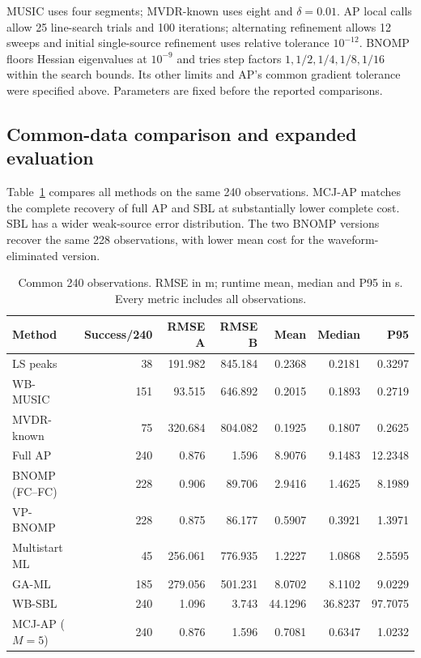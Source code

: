 \documentclass[a4paper,fleqn,review]{cas-sc}
\begin{document}
MUSIC uses four segments; MVDR-known uses eight and $\delta=0.01$. AP local calls allow 25 line-search trials and 100 iterations; alternating refinement allows 12 sweeps and initial single-source refinement uses relative tolerance $10^{-12}$. BNOMP floors Hessian eigenvalues at $10^{-9}$ and tries step factors $1,1/2,1/4,1/8,1/16$ within the search bounds. Its other limits and AP's common gradient tolerance were specified above. Parameters are fixed before the reported comparisons.

\FloatBarrier
\subsection{Common-data comparison and expanded evaluation}
Table~\ref{en:common} compares all methods on the same 240 observations. MCJ-AP matches the complete recovery of full AP and SBL at substantially lower complete cost. SBL has a wider weak-source error distribution. The two BNOMP versions recover the same 228 observations, with lower mean cost for the waveform-eliminated version.
\begin{table}[pos=H]\centering\small
\caption{Common 240 observations. RMSE in m; runtime mean, median and P95 in s. Every metric includes all observations.}\label{en:common}
\begin{tabular}{@{}lrrrrrr@{}}\toprule
Method & Success/240 & RMSE A & RMSE B & Mean & Median & P95\\\midrule
LS peaks & 38 & 191.982 & 845.184 & 0.2368 & 0.2181 & 0.3297\\
WB-MUSIC & 151 & 93.515 & 646.892 & 0.2015 & 0.1893 & 0.2719\\
MVDR-known & 75 & 320.684 & 804.082 & 0.1925 & 0.1807 & 0.2625\\
Full AP & 240 & 0.876 & 1.596 & 8.9076 & 9.1483 & 12.2348\\
BNOMP (FC--FC) & 228 & 0.906 & 89.706 & 2.9416 & 1.4625 & 8.1989\\
VP-BNOMP & 228 & 0.875 & 86.177 & 0.5907 & 0.3921 & 1.3971\\
Multistart ML & 45 & 256.061 & 776.935 & 1.2227 & 1.0868 & 2.5595\\
GA-ML & 185 & 279.056 & 501.231 & 8.0702 & 8.1102 & 9.0229\\
WB-SBL & 240 & 1.096 & 3.743 & 44.1296 & 36.8237 & 97.7075\\
MCJ-AP ($M=5$) & 240 & 0.876 & 1.596 & 0.7081 & 0.6347 & 1.0232\\\bottomrule
\end{tabular}\end{table}
\end{document}
